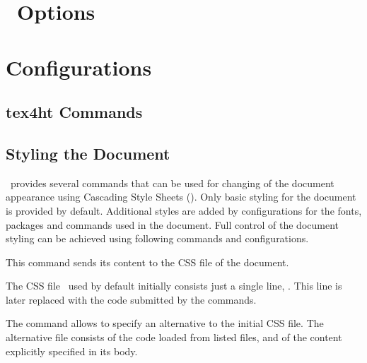 \documentclass{book}
\begin{document}
\chapter{\texfourht\ Options}



\chapter{Configurations}

\section{tex4ht Commands}

\section{Styling the Document}

\texfourht\ provides several commands that can be used for changing of the
document appearance using Cascading Style Sheets (\css). Only basic styling for
the document is provided by default. Additional styles are added by configurations for the
fonts, packages and commands used in the document. Full control of the document
styling can be achieved using following commands and configurations.



This command sends its content to the CSS file of the document. 


The CSS file \texfourht\ used by default initially consists just
a single line,  . This line is later
replaced with the code submitted by the  commands.

The \texcommand{\CssFile} command allows to specify an alternative to the initial CSS file.
The alternative file consists of the code loaded from listed files, and of the
content explicitly specified in its body.

\end{document}
